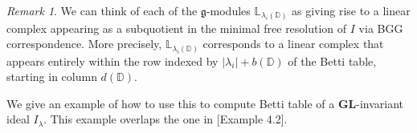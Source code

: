 \documentclass[12pt]{amsart}
\newtheorem{cor}[thm]{Corollary}
\theoremstyle{definition}
\theoremstyle{remark}
\newtheorem{rmk}[thm]{Remark}
\newcommand{\cA}{\mathcal{A}}
\newcommand{\bbB}{\mathbb{B}}
\newcommand{\bbC}{\mathbb{C}}
\newcommand{\bbD}{\mathbb{D}}
\newcommand{\bbL}{\mathbb{L}}
\newcommand{\bR}{\mathbf{R}}
\newcommand{\fg}{\mathfrak{g}}
\newcommand{\GL}{\mathbf{GL}}
\newcommand{\DS}{\displaystyle}
\numberwithin{equation}{section}
\begin{document}
\begin{comment}
\begin{cor} \label{cor:generalcase}
Suppose $m \geq n$, for any $\GL$-invariant ideal $I$ in the coordinate ring of $\bbC^{m \times n}$, we can write $I = I_{\lambda_1} + I_{\lambda_2} + \ldots + I_{\lambda_k}$ where $I_{\lambda_i}$ is the principal $\GL$-invariant ideal generated by $S_{\lambda_i} \bbC^n \otimes S_{\lambda_i} \bbC^m$. Furthermore, we assume $I_{\lambda_i}$ and $I_{\lambda_j}$ do not generate each other if $i \neq j$. Or equivalently, we assume $\lambda_i$ and $\lambda_j$ are not comparable if $i \neq j$. Then define $\cA(\lambda_i;n)$ inductively by
\begin{align*}
    \cA(\lambda_i;n) = \{ \bbD = (D_1,\ldots,D_r; \bbB) \mid & \bbD \text{ is a $\lambda_i$-admissible Dyck pattern, } l(\lambda_i(\bbD)) \leq n, \\
    & |D_i| \geq 3 \text{ for all } 1 \leq i \leq r, \nexists \bbB' \text{ and } 1 \leq j < i \text{ such that }  \\
    & (D_1,\ldots,D_r;\bbB') \in \cA(\lambda_j;n) \text{ and } \lambda_j(\bbB') = \lambda_i(\bbB) \}.
\end{align*}
We have the following equality in the Grothendieck group $K_0(\fg)$ of finite dimensional representations of $\fg$.
\begin{align}
\DS    [H_m(\tilde{\bR}(I))] = \sum_{i = 1}^k \sum_{\substack{\bbD \in \cA(\lambda_i;n) \\ b(\bbD) = m - |\lambda_i|}} [\bbL_{\lambda_i(\bbD)}].
\end{align}
\end{cor}
\end{comment}


\begin{rmk}
We can think of each of the $\fg$-modules $\bbL_{\lambda_i(\bbD)}$ as giving rise to a linear complex appearing as a subquotient in the minimal free resolution of $I$ via BGG correspondence. More precisely, $\bbL_{\lambda_i(\bbD)}$ corresponds to a linear complex that appears entirely within the row indexed by $|\lambda_i| + b(\bbD)$ of the Betti table, starting in column $d(\bbD)$.
\end{rmk}

We give an example of how to use this to compute Betti table of a $\GL$-invariant ideal $I_{\lambda}$. This example overlaps the one in \cite{RW}[Example 4.2].
\end{document}
